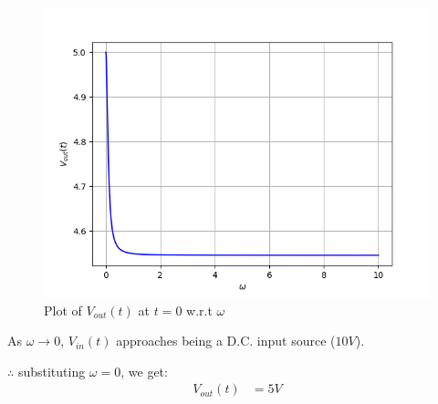 \documentclass[journal,12pt,twocolumn]{IEEEtran}
\theoremstyle{remark}
\begin{document}
\begin{figure}[!h]
    \centering
    \includegraphics[width = \columnwidth]{figs/V_out_plot.png}
    \caption{Plot of $V_{out}(t)$ at $t=0$ w.r.t $\omega$}
    \label{fig:3_gate.22.ee.31}
\end{figure}

As $\omega \rightarrow 0$, $V_{in}(t)$ approaches being a D.C. input source ($10V$).

$\therefore$ substituting $\omega = 0$, we get:
\begin{align}
    V_{out}(t) &= 5V
\end{align}
\end{document}
